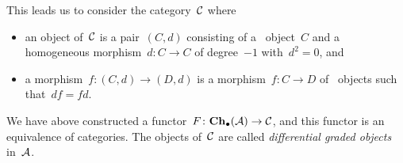 \begin{remark}
\begin{enumerate}
      This leads us to consider the category~$\mathcal{C}$ where
      \begin{itemize}
        \item
          an object of~$\mathcal{C}$ is a pair~$(C,d)$ consisting of a~ object~$C$ and a homogeneous morphism~$d \colon C \to C$ of degree~$-1$ with~$d^2 = 0$, and
        \item
          a morphism~$f \colon (C,d) \to (D,d)$ is a morphism~$f \colon C \to D$ of~ objects such that~$d f = f d$.
      \end{itemize}
      We have above constructed a functor~$F \colon \mathbf{Ch}_\bullet(\mathcal{A}) \to \mathcal{C}$, and this functor is an equivalence of categories.
      The objects of~$\mathcal{C}$ are called \emph{differential graded objects} in~$\mathcal{A}$.
  \end{enumerate}
\end{remark}


